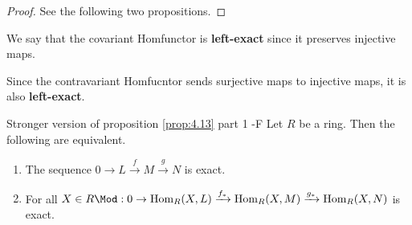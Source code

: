 \documentclass[twoside = false,	%
		headsepline,		%
		parskip = true,
		]{scrbook}						%
\begin{document}
        \begin{proof}
            See the following two propositions.
        \end{proof}

        We say that the covariant Homfunctor is \textbf{left-exact} since it preserves injective maps.

        Since the contravariant Homfucntor sends surjective maps to injective maps, it is also \textbf{left-exact}.

        \begin{proposition*}{Stronger version of proposition \ref{prop:4.13} part 1 -F}
            Let $R$ be a ring. Then the following are equivalent.
            \begin{enumerate}
                \item The sequence $0 \to L \xrightarrow{f} M \xrightarrow{g} N$ is exact.
                \item For all $X \in R\Mod:
                0 \to \Hom_R(X,L) \xrightarrow{f_*} \Hom_R(X,M) \xrightarrow{g_*} \Hom_R(X,N)$ is exact.
            \end{enumerate}
        \end{proposition*}
\end{document}
